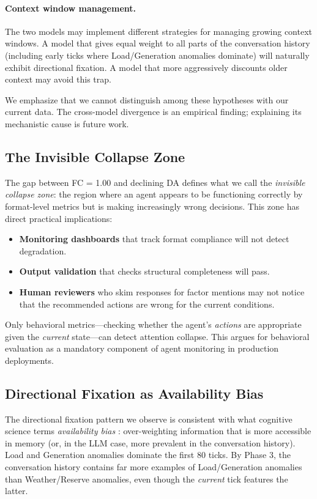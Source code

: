 \documentclass{article}
\begin{document}
\paragraph{Context window management.} The two models may implement
different strategies for managing growing context windows. A model that
gives equal weight to all parts of the conversation history (including
early ticks where Load/Generation anomalies dominate) will naturally
exhibit directional fixation. A model that more aggressively discounts
older context may avoid this trap.

We emphasize that we cannot distinguish among these hypotheses with our
current data. The cross-model divergence is an empirical finding;
explaining its mechanistic cause is future work.

\subsection{The Invisible Collapse Zone}

The gap between FC = 1.00 and declining DA defines what we call the
\emph{invisible collapse zone}: the region where an agent appears to be
functioning correctly by format-level metrics but is making increasingly
wrong decisions. This zone has direct practical implications:

\begin{itemize}
    \item \textbf{Monitoring dashboards} that track format compliance
    will not detect degradation.
    \item \textbf{Output validation} that checks structural completeness
    will pass.
    \item \textbf{Human reviewers} who skim responses for factor
    mentions may not notice that the recommended actions are wrong for
    the current conditions.
\end{itemize}

Only behavioral metrics---checking whether the agent's \emph{actions}
are appropriate given the \emph{current} state---can detect attention
collapse. This argues for behavioral evaluation as a mandatory component
of agent monitoring in production deployments.

\subsection{Directional Fixation as Availability Bias}

The directional fixation pattern we observe is consistent with what
cognitive science terms \emph{availability bias}
\cite{tversky1974judgment}: over-weighting information that is more
accessible in memory (or, in the LLM case, more prevalent in the
conversation history). Load and Generation anomalies dominate the first
80 ticks. By Phase 3, the conversation history contains far more
examples of Load/Generation anomalies than Weather/Reserve anomalies,
even though the \emph{current} tick features the latter.
\end{document}
